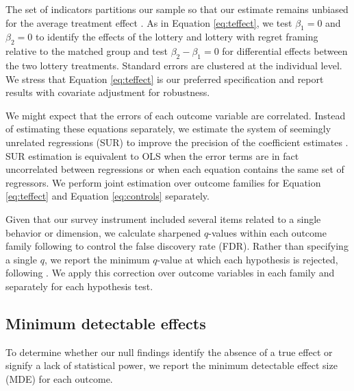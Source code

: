\documentclass[11pt]{article}
\begin{document}
		The set of indicators partitions our sample so that our estimate remains unbiased for the average treatment effect . As in Equation \ref{eq:teffect}, we test $\beta_{1} = 0$ and $\beta_{2} = 0$ to identify the effects of the lottery and lottery with regret framing relative to the matched group and test $\beta_{2} - \beta_{1} = 0$ for differential effects between the two lottery treatments. Standard errors are clustered at the individual level. We stress that Equation \ref{eq:teffect} is our preferred specification and report results with covariate adjustment for robustness.

		We might expect that the errors of each outcome variable are correlated. Instead of estimating these equations separately, we estimate the system of seemingly unrelated regressions (SUR) to improve the precision of the coefficient estimates . SUR estimation is equivalent to OLS when the error terms are in fact uncorrelated between regressions or when each equation contains the same set of regressors. We perform joint estimation over outcome families for Equation \ref{eq:teffect} and Equation \ref{eq:controls} separately.

		Given that our survey instrument included several items related to a single behavior or dimension, we calculate sharpened $q$-values within each outcome family following  to control the false discovery rate (FDR). Rather than specifying a single $q$, we report the minimum $q$-value at which each hypothesis is rejected, following . We apply this correction over outcome variables in each family and separately for each hypothesis test.


	\subsection{Minimum detectable effects}

		To determine whether our null findings identify the absence of a true effect or signify a lack of statistical power, we report the minimum detectable effect size (MDE) for each outcome.
\end{document}
